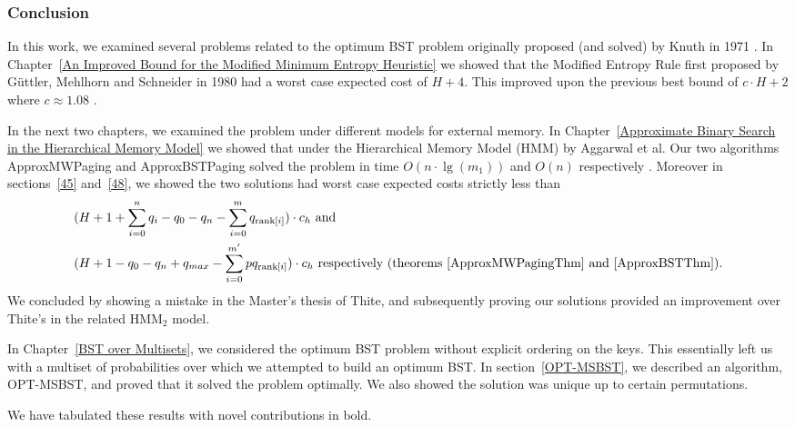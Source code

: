 \documentclass[]{beamer}
\theoremstyle{plain}
\begin{document}
\begin{frame} \frametitle{Conclusion}

In this work, we examined several problems related to the optimum BST problem originally proposed (and solved) by Knuth in 1971 \cite{knuth1971optimum}. In Chapter~\ref{An Improved Bound for the Modified Minimum Entropy Heuristic} we showed that the Modified Entropy Rule first proposed by  G{\"u}ttler, Mehlhorn and Schneider in 1980 had a worst case expected cost of $H+4$. This improved upon the previous best bound of $c\cdot H+2$ where $c \approx 1.08$ \cite{guttler1980binary}.

 In the next two chapters, we examined the problem under different models for external memory. In Chapter~\ref{Approximate Binary Search in the Hierarchical Memory Model} we showed that under the Hierarchical Memory Model (HMM) by Aggarwal et al. Our two algorithms ApproxMWPaging and ApproxBSTPaging solved the problem in time $O(n\cdot \lg(m_1))$ and $O(n)$ respectively \cite{aggarwal1987model}. Moreover in sections~\ref{45} and~\ref{48}, we showed the two solutions had worst case expected costs strictly less than
\begin{align*}
&(H + 1 + \sum_{i=0}^n q_i - q_0 - q_n - \sum_{i=0}^m q_{\text{rank}[i]}) \cdot  c_h \text{ and} \\
&(H + 1 - q_0 - q_n + q_{max} - \sum_{i=0}^{m'} pq_{\text{rank}[i]})\cdot c_h \text{ respectively  (theorems~\ref{ApproxMWPagingThm} and~\ref{ApproxBSTThm})}.
\end{align*}
   We concluded by showing a mistake in the Master's thesis of Thite, and subsequently proving our solutions provided an improvement over Thite's in the related HMM$_2$ model.

In Chapter~\ref{BST over Multisets}, we considered the optimum BST problem without explicit ordering on the keys. This essentially left us with a multiset of probabilities over which we attempted to build an optimum BST. In section~\ref{OPT-MSBST}, we described an algorithm, OPT-MSBST, and proved that it solved the problem optimally. We also showed the solution was unique up to certain permutations.

We have tabulated these results with novel contributions in bold.

\begin{table}[!hb]



\end{table}
\end{frame}
\end{document}
